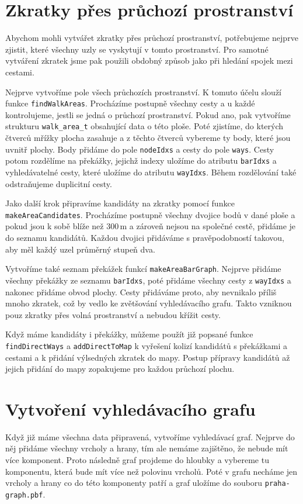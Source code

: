 \section{Zkratky přes průchozí prostranství}
Abychom mohli vytvářet zkratky přes průchozí prostranství, potřebujeme nejprve
zjistit, které všechny uzly se vyskytují v tomto prostranství. Pro samotné
vytváření zkratek jsme pak použili obdobný způsob jako při hledání spojek mezi
cestami. 

Nejprve vytvoříme pole všech průchozích prostranství.  K tomuto účelu
slouží funkce \verb|findWalkAreas|. Procházíme postupně všechny cesty a u každé
kontrolujeme, jestli se jedná o průchozí prostranství. Pokud ano, pak vytvoříme
strukturu \verb|walk_area_t| obsahující data o této ploše. Poté zjistíme, do
kterých čtverců mřížky plocha zasahuje a z těchto čtverců vybereme ty body,
které jsou uvnitř plochy. Body přidáme do pole \verb|nodeIdxs| a cesty do pole
\verb|ways|. Cesty potom rozdělíme na překážky, jejichž indexy uložíme do
atributu \verb|barIdxs| a vyhledávatelné cesty, které uložíme do atributu
\verb|wayIdxs|. Během rozdělování také odstraňujeme duplicitní cesty. 

Jako další krok připravíme kandidáty na zkratky pomocí funkce
\verb|makeAreaCandidates|. Procházíme postupně všechny dvojice bodů v dané ploše
a pokud jsou k sobě blíže než 300\,m a zároveň nejsou na společné cestě, přidáme
je do seznamu kandidátů. Každou dvojici přidáváme s pravěpodobností takovou, aby
měl každý uzel průměrný stupeň dva.

Vytvoříme také seznam překážek funkcí \verb|makeAreaBarGraph|. Nejprve přidáme
všechny překážky ze seznamu \verb|barIdxs|, poté přidáme všechny cesty z
\verb|wayIdxs| a nakonec přidáme obvod plochy. Cesty přidáváme proto, aby
nevnikalo příliš mnoho zkratek, což by vedlo ke zvětšování vyhledávacího grafu.
Takto vzniknou pouz zkratky přes volná prostranství a nebudou křížit cesty.

Když máme kandidáty i překážky, můžeme použít již popsané funkce
\verb|findDirectWays| a \verb|addDirectToMap| k vyřešení kolizí kandidátů s
překážkami a cestami a k přidání výlsedných zkratek do mapy. Postup přípravy
kandidátů až jejich přidání do mapy zopakujeme pro každou průchozí plochu.


\section{Vytvoření vyhledávacího grafu}
Když již máme všechna data připravená, vytvoříme vyhledávací graf. Nejprve do
něj přidáme všechny vrcholy a hrany, tím ale nemáme zajištěno, že nebude mít
více komponent. Proto následně graf projdeme do hloubky a vybereme tu
komponentu, která bude mít více než polovinu vrcholů. Poté v grafu necháme jen
vrcholy a hrany co do této komponenty patří a graf uložíme do souboru
\verb|praha-graph.pbf|. 
